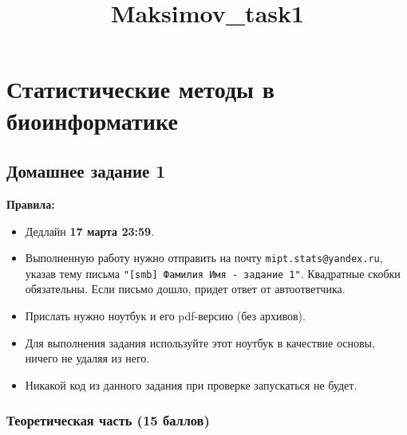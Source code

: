 \documentclass[11pt]{article}
\title{Maksimov\_task1}
\providecommand{\tightlist}{%
      \setlength{\itemsep}{0pt}\setlength{\parskip}{0pt}}
\begin{document}
    
    
    \maketitle
    
    

    
    \hypertarget{ux441ux442ux430ux442ux438ux441ux442ux438ux447ux435ux441ux43aux438ux435-ux43cux435ux442ux43eux434ux44b-ux432-ux431ux438ux43eux438ux43dux444ux43eux440ux43cux430ux442ux438ux43aux435}{%
\section{Статистические методы в
биоинформатике}\label{ux441ux442ux430ux442ux438ux441ux442ux438ux447ux435ux441ux43aux438ux435-ux43cux435ux442ux43eux434ux44b-ux432-ux431ux438ux43eux438ux43dux444ux43eux440ux43cux430ux442ux438ux43aux435}}

\hypertarget{ux434ux43eux43cux430ux448ux43dux435ux435-ux437ux430ux434ux430ux43dux438ux435-1}{%
\subsection{Домашнее задание
1}\label{ux434ux43eux43cux430ux448ux43dux435ux435-ux437ux430ux434ux430ux43dux438ux435-1}}

\textbf{Правила:}

\begin{itemize}
\tightlist
\item
  Дедлайн \textbf{17 марта 23:59}.
\item
  Выполненную работу нужно отправить на почту
  \texttt{mipt.stats@yandex.ru}, указав тему письма
  \texttt{"{[}smb{]}\ Фамилия\ Имя\ -\ задание\ 1"}. Квадратные скобки
  обязательны. Если письмо дошло, придет ответ от автоответчика.
\item
  Прислать нужно ноутбук и его pdf-версию (без архивов).
\item
  Для выполнения задания используйте этот ноутбук в качествие основы,
  ничего не удаляя из него.
\item
  Никакой код из данного задания при проверке запускаться не будет.
\end{itemize}

    \hypertarget{ux442ux435ux43eux440ux435ux442ux438ux447ux435ux441ux43aux430ux44f-ux447ux430ux441ux442ux44c-15-ux431ux430ux43bux43bux43eux432}{%
\subsubsection{Теоретическая часть (15
баллов)}\label{ux442ux435ux43eux440ux435ux442ux438ux447ux435ux441ux43aux430ux44f-ux447ux430ux441ux442ux44c-15-ux431ux430ux43bux43bux43eux432}}
\end{document}
